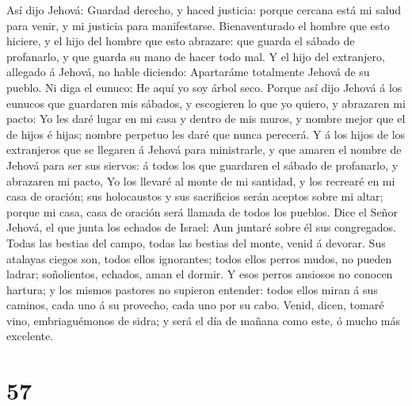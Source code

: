 Así dijo Jehová: Guardad derecho, y haced justicia: porque
cercana está mi salud para venir, y mi justicia para manifestarse.
 Bienaventurado el hombre que esto hiciere, y el hijo del
hombre que esto abrazare: que guarda el sábado de profanarlo, y que
guarda su mano de hacer todo mal.  Y el hijo del extranjero,
allegado á Jehová, no hable diciendo: Apartaráme totalmente Jehová de su
pueblo. Ni diga el eunuco: He aquí yo soy árbol seco. 
Porque así dijo Jehová á los eunucos que guardaren mis sábados, y
escogieren lo que yo quiero, y abrazaren mi pacto:  Yo les
daré lugar en mi casa y dentro de mis muros, y nombre mejor que el de
hijos é hijas; nombre perpetuo les daré que nunca perecerá. 
Y á los hijos de los extranjeros que se llegaren á Jehová para
ministrarle, y que amaren el nombre de Jehová para ser sus siervos: á
todos los que guardaren el sábado de profanarlo, y abrazaren mi pacto,
 Yo los llevaré al monte de mi santidad, y los recrearé en
mi casa de oración; sus holocaustos y sus sacrificios serán aceptos
sobre mi altar; porque mi casa, casa de oración será llamada de todos
los pueblos.  Dice el Señor Jehová, el que junta los echados
de Israel: Aun juntaré sobre él sus congregados.  Todas las
bestias del campo, todas las bestias del monte, venid á devorar.
 Sus atalayas ciegos son, todos ellos ignorantes; todos
ellos perros mudos, no pueden ladrar; soñolientos, echados, aman el
dormir.  Y esos perros ansiosos no conocen hartura; y los
mismos pastores no supieron entender: todos ellos miran á sus caminos,
cada uno á su provecho, cada uno por su cabo.  Venid,
dicen, tomaré vino, embriaguémonos de sidra; y será el día de mañana
como este, ó mucho más excelente.

\hypertarget{section-56}{%
\section{57}\label{section-56}}

